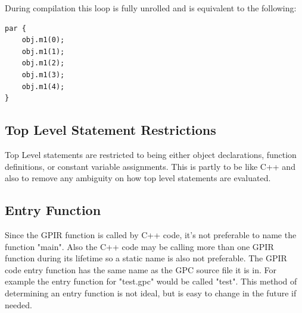 During compilation this loop is fully unrolled and is equivalent
to the following:

\begin{lstlisting}[style=myGPC]
par {
    obj.m1(0);
    obj.m1(1);
    obj.m1(2);
    obj.m1(3);
    obj.m1(4);
}
\end{lstlisting}


\subsection{Top Level Statement Restrictions}
Top Level statements are restricted to being either object declarations, function definitions,
or constant variable assignments. This is partly to be like C++ and also to remove any ambiguity
on how top level statements are evaluated.


\subsection{Entry Function}
Since the GPIR function is called by C++ code, it's not preferable to name the function "main".
Also the C++ code may be calling more than one GPIR function during its lifetime so a static
name is also not preferable. The GPIR code entry function has the same name as the GPC source
file it is in. For example the entry function  for "test.gpc" would be called "test". This method
of determining an entry function is not ideal, but is easy to change in the future if needed.





